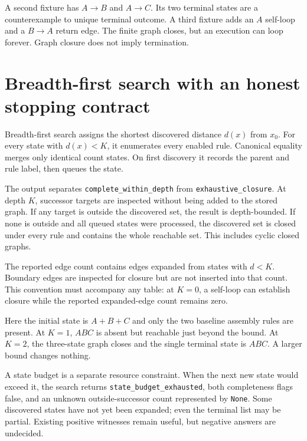 A second fixture has $A\to B$ and $A\to C$. Its two terminal states are a
counterexample to unique terminal outcome. A third fixture adds an $A$ self-loop
and a $B\to A$ return edge. The finite graph closes, but an execution can loop
forever. Graph closure does not imply termination.

\section{Breadth-first search with an honest stopping contract}
Breadth-first search assigns the shortest discovered distance $d(x)$ from $x_0$.
For every state with $d(x)<K$, it enumerates every enabled rule. Canonical equality
merges only identical count states. On first discovery it records the parent and
rule label, then queues the state.


The output separates \texttt{complete\_within\_depth} from
\texttt{exhaustive\_closure}. At depth $K$, successor targets are inspected without
being added to the stored graph. If any target is outside the discovered set,
the result is depth-bounded. If none is outside and all queued states were
processed, the discovered set is closed under every rule and contains the whole
reachable set. This includes cyclic closed graphs.

The reported edge count contains edges expanded from states with $d<K$.
Boundary edges are inspected for closure but are not inserted into that count.
This convention must accompany any table: at $K=0$, a self-loop can establish
closure while the reported expanded-edge count remains zero.

\begin{center}\end{center}
Here the initial state is $A+B+C$ and only the two baseline assembly rules are
present. At $K=1$, $ABC$ is absent but reachable just beyond the bound. At $K=2$,
the three-state graph closes and the single terminal state is $ABC$. A larger
bound changes nothing.

A state budget is a separate resource constraint. When the next new state would
exceed it, the search returns \texttt{state\_budget\_exhausted},
both completeness flags false, and an unknown outside-successor count represented
by \texttt{None}. Some discovered states have not yet been expanded; even the
terminal list may be partial. Existing positive witnesses remain useful, but
negative answers are undecided.

